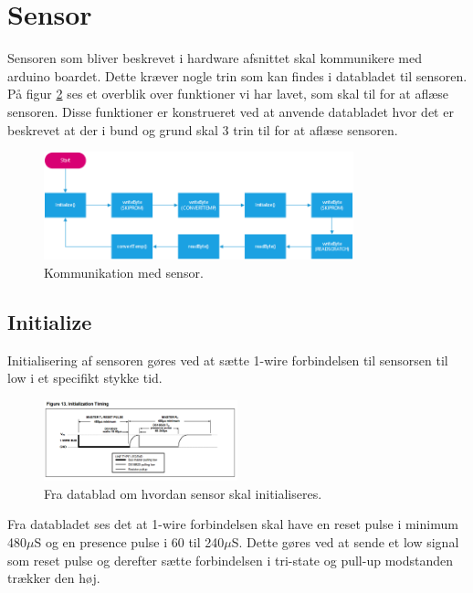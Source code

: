 \section{Sensor}
Sensoren som bliver beskrevet i hardware afsnittet skal kommunikere med arduino boardet. Dette kræver nogle trin som kan findes i databladet til sensoren. På figur \ref{sensor_kom} ses et overblik over funktioner vi har lavet, som skal til for at aflæse sensoren. Disse funktioner er konstrueret ved at anvende databladet hvor det er beskrevet at der i bund og grund skal 3 trin til for at aflæse sensoren.



\begin{figure}[h!]
  \centering
  \includegraphics[width=0.8\textwidth]{figures/ds18b20_sensor_communication.png}
  \caption{Kommunikation med sensor.}
  \label{sensor_kom}
\end{figure}

\newpage
\subsection{Initialize}
Initialisering af sensoren gøres ved at sætte 1-wire forbindelsen til sensorsen til low i et specifikt stykke tid.

\begin{figure}[h!]
  \centering
  \includegraphics[width=0.5\textwidth]{figures/Initialization_timing.png}
  \caption{Fra datablad om hvordan sensor skal initialiseres.}
  \label{sensor_kom}
\end{figure}

Fra databladet ses det at 1-wire forbindelsen skal have en reset pulse i minimum 480$\mu$S og en presence pulse i 60 til 240$\mu$S. Dette gøres ved at sende et low signal som reset pulse og derefter sætte forbindelsen i tri-state og pull-up modstanden trækker den høj. 

